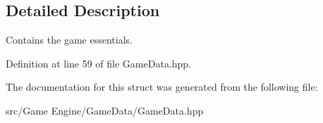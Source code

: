 \subsection{Detailed Description}
Contains the game essentials. 

\begin{DoxyVerb}\end{DoxyVerb}
 

Definition at line 59 of file Game\+Data.\+hpp.



The documentation for this struct was generated from the following file\+:\begin{DoxyCompactItemize}
\item 
src/\+Game Engine/\+Game\+Data/Game\+Data.\+hpp\end{DoxyCompactItemize}
